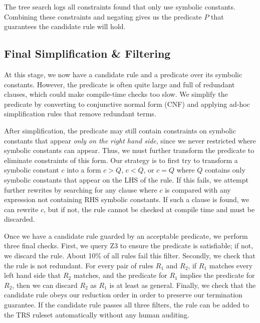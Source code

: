 \documentclass[sigplan,10pt,review,anonymous]{acmart}\settopmatter{printfolios=true,printccs=false,printacmref=false}
\begin{document}
The tree search logs all constraints found that only use symbolic constants.  Combining
these constraints and negating gives us the predicate $P$ that guarantees the candidate rule will hold.

\subsection{Final Simplification \& Filtering} At this stage, we now have a candidate
rule and a predicate over its symbolic constants.  However, the predicate is often quite
large and full of redundant clauses, which could make compile-time checks too slow.
We simplify the predicate by converting to conjunctive normal form (CNF) and applying
ad-hoc simplification rules that remove redundant terms.

After simplification, the predicate may still contain constraints on symbolic constants
that appear \textit{only on the right hand side}, since we never restricted where symbolic constants
 can appear.  Thus, we must further transform the predicate to eliminate
constraints of this form.  Our strategy is to first try to transform a symbolic constant
$c$ into a form $c > Q$, $c < Q$, or $c = Q$ where $Q$ contains only symbolic constants
that appear on the LHS of the rule.  If this fails, we attempt further rewrites by
searching for any clause where $c$ is compared with any expression not containing RHS
symbolic constants.  If such a clause is found, we can rewrite $c$, but if not, the rule
cannot be checked at compile time and must be discarded.

Once we have a candidate rule guarded by an acceptable predicate, we perform three final checks.
First, we query Z3 to ensure the
predicate is satisfiable; if not, we discard the rule.  About 10\% of all rules fail
this filter.  Secondly, we check that the rule is not redundant.  For every pair of
rules $R_1$ and $R_2$, if $R_1$ matches every left hand side that $R_2$ matches,
and the predicate for $R_1$ implies the predicate for $R_2$, then we can discard $R_2$
as $R_1$ is at least as general. Finally, we check that the candidate rule obeys our
reduction order in order to preserve our termination guarantee. If the candidate rule passes all three filters, the rule can be added to the TRS ruleset automatically without any human auditing.
\end{document}
